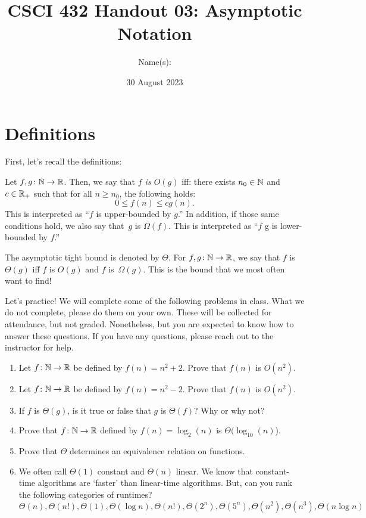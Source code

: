 \documentclass{article}
\title{CSCI 432 Handout 03: Asymptotic Notation}
\author{Name(s): \rule{3in}{0.15mm} }
\date{30 August 2023}
\begin{document}
\maketitle

\section*{Definitions}

First, let's recall the definitions:

\begin{definition}
    Let $f,g \colon {\mathbb N} \to {\mathbb R}$.  Then, we say that \emph{$f$ is $O(g)$} iff: there
    exists $n_0 \in {\mathbb N}$ and $c \in {\mathbb R}_{+}$ such that for all $n \geq n_0$, the
    following holds:
    $$ 0 \leq f(n) \leq cg(n). $$
    This is interpreted as ``$f$ is upper-bounded by $g$.''
    In addition, if those same conditions hold, we also say that~$g$ is $\Omega(f)$.  This is interpreted as
    ``$f$ g is lower-bounded by $f$.''

    The asymptotic tight bound is denoted by $\Theta$.  For $f,g \colon {\mathbb N} \to
    {\mathbb R}$, we say that $f$ is $\Theta(g)$ iff $f$ is $O(g)$ and $f$
    is~$\Omega(g)$. This is the bound that we most often want to find!
\end{definition}

Let's practice!  We will complete some of the following problems
in class.  What we do not
complete, please do them on your own.  These will be collected for attendance,
but not graded. Nonetheless,
but you are expected to know how to answer these questions. If you have any
questions, please reach out to the instructor for help.

\begin{enumerate}
    \item Let $f \colon {\mathbb N} \to {\mathbb R}$ be defined by $f(n) = n^2+2$. Prove that
        $f(n)$ is $O(n^2)$.
        \practice
    \pagebreak
    \item Let $f \colon {\mathbb N} \to {\mathbb R}$ be defined by $f(n) = n^2-2$. Prove that
        $f(n)$ is $O(n^2)$.
        \practice
    \item If $f$ is $\Theta(g)$, is it true or false that $g$ is $\Theta(f)$?
        Why or why not?
        \practice
    \item Prove that $f \colon {\mathbb N} \to {\mathbb R}$ defined by $f(n) = \log_2(n)$ is
        $\Theta(\log_{10}(n)$).
        \practice
    \item Prove that $\Theta$ determines an equivalence relation on functions.
        \practice
    \newpage
    \item We often call $\Theta(1)$ constant and $\Theta(n)$ linear.  We know
        that constant-time algorithms are `faster' than linear-time algorithms.
        But, can you rank the following categories of runtimes?
        $$
        \Theta(n), \Theta(n!), \Theta(1), \Theta(\log n), \Theta(n!),
        \Theta(2^n), \Theta(5^n), \Theta(n^2), \Theta(n^3), \Theta(n \log n)
        $$
        \practice
\end{enumerate}
\end{document}
